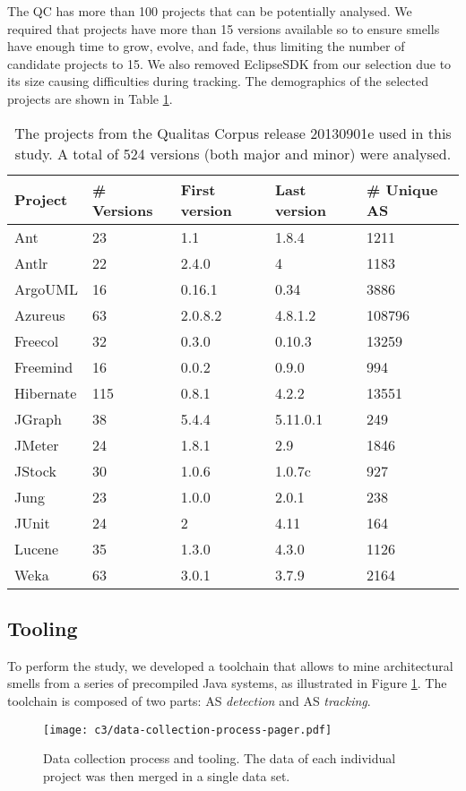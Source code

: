 The QC has more than 100 projects that can be potentially analysed. We required that projects have more than 15 versions available so to ensure smells have enough time to grow, evolve, and fade, thus limiting  the number of candidate projects to 15.
We also removed EclipseSDK from our selection due to its size causing difficulties during tracking.
The demographics of the selected projects are shown in Table \ref{tab:projects}.

\begin{table}[]
    \centering
    \caption{The projects from the Qualitas Corpus release 20130901e used in this study. A total of 524 versions (both major and minor) were analysed.}
    \label{tab:projects}
    \begin{tabular}{@{}lllll@{}}
    \toprule
    \textbf{Project} & \textbf{\# Versions} & \textbf{First version} & \textbf{Last version} & \textbf{\# Unique AS} \\ \midrule
    Ant & 23 & 1.1 & 1.8.4 & 1211\\
    Antlr & 22 & 2.4.0 & 4 & 1183 \\
    ArgoUML & 16 & 0.16.1 & 0.34 & 3886 \\
    Azureus & 63 & 2.0.8.2 & 4.8.1.2 & 108796 \\
    Freecol & 32 & 0.3.0 & 0.10.3 & 13259 \\
    Freemind & 16 & 0.0.2 & 0.9.0 & 994 \\
    Hibernate & 115 & 0.8.1 & 4.2.2 & 13551\\
    JGraph & 38 & 5.4.4 & 5.11.0.1 & 249\\
    JMeter & 24 & 1.8.1 & 2.9 & 1846\\
    JStock & 30 & 1.0.6 & 1.0.7c & 927 \\
    Jung & 23 & 1.0.0 & 2.0.1 & 238 \\
    JUnit & 24 & 2 & 4.11 & 164 \\
    Lucene & 35 & 1.3.0 & 4.3.0 & 1126 \\
    Weka & 63 & 3.0.1 & 3.7.9 & 2164 \\ \bottomrule
    \end{tabular}
\end{table}

\subsection{Tooling}
To perform the study, we developed a toolchain that allows to mine architectural smells from a series of precompiled Java systems, as illustrated in Figure \ref{c3:fig:data-collection}.
The toolchain is composed of two parts: AS \emph{detection} and AS \emph{tracking}.
\begin{figure}
    \centering
    \texttt{[image: c3/data-collection-process-pager.pdf]}
    \caption{Data collection process and tooling. The data of each individual project was then merged in a single data set.}\label{c3:fig:data-collection}
\end{figure}
